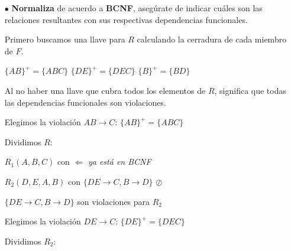 \documentclass[12pt, letterpaper]{article}
\begin{document}
\begin{itemize}
\begin{itemize}
\begin{itemize}
                        \item[$\bullet$]    \textbf{Normaliza} de acuerdo a 
                                            \textbf{BCNF}, asegúrate de indicar 
                                            cuáles son las relaciones
                                            resultantes con sus respectivas 
                                            dependencias funcionales. \vspace{.3cm}

                                            Primero buscamos una llave para $R$ calculando la cerradura 
                                            de cada miembro de $F$. \vspace{.1cm}

                                            $\{AB\}^+=\{ABC\}$ \hspace{.5cm} $\{DE\}^+=\{DEC\}$ \hspace{.5cm} $\{B\}^+=\{BD\}$\vspace{.3cm}

                                            Al no haber una llave que cubra todos los elementos de $R$, significa que 
                                            todas las dependencias funcionales son violaciones.\vspace{.3cm}

                                            Elegimos la violación $AB \rightarrow C$: $\{AB\}^+=\{ABC\}$\vspace{.3cm}

                                            Dividimos $R$: \vspace{.2cm}

                                            $R_{1}(A,B,C)$ con  \checkmark $\Leftarrow$ \textit{ya está en BCNF} \vspace{.1cm}

                                            $R_{2}(D,E,A,B)$ con $\{DE \rightarrow C, B \rightarrow D\}$ $\oslash$ \vspace{.3cm}

                                            $\{DE \rightarrow C, B \rightarrow D\}$ son violaciones para $R_{2}$ \vspace{.3cm}

                                            Elegimos la violación $DE \rightarrow C$: $\{DE\}^+=\{DEC\}$ \vspace{.3cm}

                                            Dividimos $R_{2}$: \vspace{.2cm}


\end{itemize}
\end{itemize}
\end{itemize}
\end{document}
